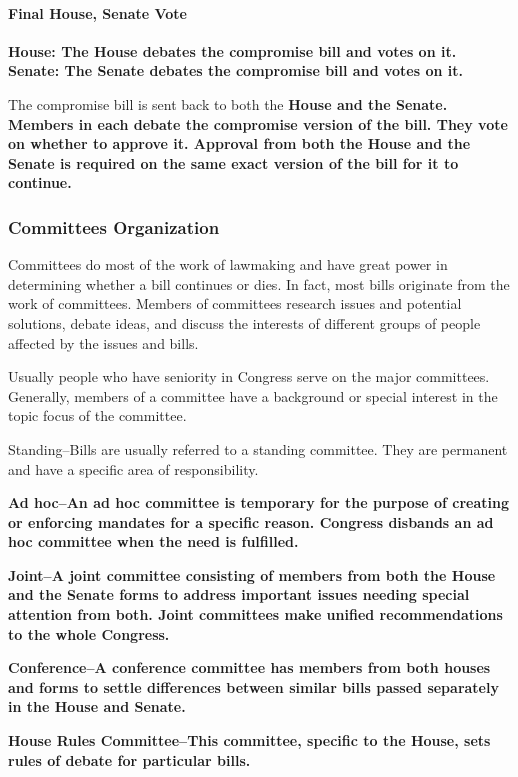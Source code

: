 \paragraph{Final House, Senate Vote}

\bf{House}: The \bf{House} debates the compromise bill and votes on it.
\bf{Senate}: The \bf{Senate} debates the compromise bill and votes on it.

The compromise bill is sent back to both the \bf{House} and the \bf{Senate}. Members in each debate the compromise version of the bill. They vote on whether to approve it. Approval from both the \bf{House} and the \bf{Senate} is required on the same exact version of the bill for it to continue.

\subsubsection*{Committees Organization}

Committees do most of the work of lawmaking and have great power in determining whether a bill continues or dies. In fact, most bills originate from the work of committees. Members of committees research issues and potential solutions, debate ideas, and discuss the interests of different groups of people affected by the issues and bills.

Usually people who have seniority in Congress serve on the major committees. Generally, members of a committee have a background or special interest in the topic focus of the committee.

Standing–Bills are usually referred to a standing committee. They are permanent and have a specific area of responsibility.

\bf{Ad hoc–An ad hoc} committee is temporary for the purpose of creating or enforcing mandates for a specific reason. Congress disbands an ad hoc committee when the need is fulfilled.

\bf{Joint–A joint} committee consisting of members from both the \bf{House} and the \bf{Senate} forms to address important issues needing special attention from both. \bf{Joint committees} make unified recommendations to the whole Congress.

\bf{Conference–A conference} committee has members from both houses and forms to settle differences between similar bills passed separately in the House and Senate.

\bf{House Rules Committee–This committee}, specific to the \bf{House}, sets rules of debate for particular bills.

